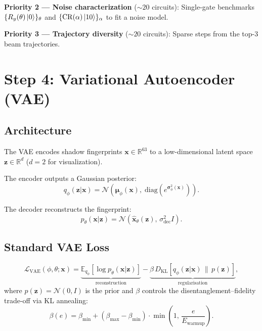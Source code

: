 \documentclass[11pt,a4paper]{article}
\begin{document}
\textbf{Priority 2 — Noise characterization} ($\sim 20$ circuits):
Single-gate benchmarks $\{R_y(\theta)\ket{0}\}_\theta$ and
$\{\mathrm{CR}(\alpha)\ket{10}\}_\alpha$ to fit a noise model.

\textbf{Priority 3 — Trajectory diversity} ($\sim 20$ circuits):
Sparse steps from the top-3 beam trajectories.

\section{Step 4: Variational Autoencoder (VAE)}\label{sec:vae}

\subsection{Architecture}

The VAE encodes shadow fingerprints $\mathbf{x} \in \mathbb{R}^{63}$ to a
low-dimensional latent space $\mathbf{z} \in \mathbb{R}^d$ ($d=2$ for visualization).

The encoder outputs a Gaussian posterior:
\begin{equation}
    q_\phi(\mathbf{z} | \mathbf{x}) = \mathcal{N}\!\left(\boldsymbol{\mu}_\phi(\mathbf{x}),\;
    \mathrm{diag}\!\left(e^{\boldsymbol{\sigma}^2_\phi(\mathbf{x})}\right)\right).
\end{equation}

The decoder reconstructs the fingerprint:
\begin{equation}
    p_\theta(\mathbf{x} | \mathbf{z}) = \mathcal{N}\!\left(\hat{\mathbf{x}}_\theta(\mathbf{z}),\,
    \sigma^2_{\mathrm{dec}} I\right).
\end{equation}

\subsection{Standard VAE Loss}

\begin{equation}
    \mathcal{L}_{\mathrm{VAE}}(\phi, \theta; \mathbf{x})
    = \underbrace{\mathbb{E}_{q_\phi}\!\left[\log p_\theta(\mathbf{x}|\mathbf{z})\right]}_{\text{reconstruction}}
    - \underbrace{\beta\, D_{\mathrm{KL}}\!\left[q_\phi(\mathbf{z}|\mathbf{x})\,\|\,p(\mathbf{z})\right]}_{\text{regularisation}},
\end{equation}
where $p(\mathbf{z}) = \mathcal{N}(0, I)$ is the prior and $\beta$ controls the
disentanglement--fidelity trade-off via KL annealing:
\begin{equation}
    \beta(e) = \beta_{\min} + \left(\beta_{\max} - \beta_{\min}\right)
    \cdot \min\!\left(1,\, \frac{e}{E_{\mathrm{warmup}}}\right).
\end{equation}
\end{document}
